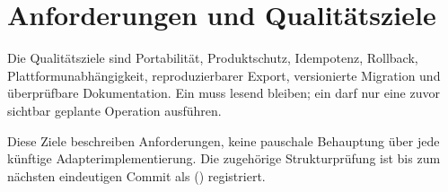 \section{Anforderungen und Qualitätsziele}
\label{chap:requirements-quality-goals}

Die Qualitätsziele sind Portabilität, Produktschutz, Idempotenz, Rollback,
Plattformunabhängigkeit, reproduzierbarer Export, versionierte Migration und
überprüfbare Dokumentation. Ein \CheckMode{} muss lesend bleiben; ein \FullFix{} darf
nur eine zuvor sichtbar geplante Operation ausführen.


Diese Ziele beschreiben Anforderungen, keine pauschale Behauptung über jede künftige
Adapterimplementierung. Die zugehörige Strukturprüfung ist bis zum nächsten
eindeutigen Commit als \Planned{} () registriert.
